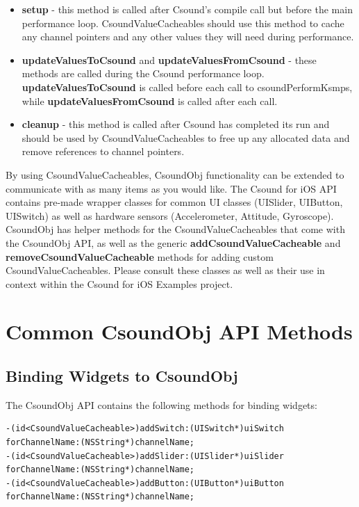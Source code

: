 \documentclass[11pt]{article}
\begin{document}
\begin{itemize}
\item \textbf{setup} - this method is called after Csound's compile call but before the main performance loop. CsoundValueCacheables should use this method to cache any channel pointers and any other values they will need during performance.
\item \textbf{updateValuesToCsound} and \textbf{updateValuesFromCsound} - these methods are called during the Csound performance loop. \textbf{updateValuesToCsound} is called before each call to csoundPerformKsmps, while \textbf{updateValuesFromCsound} is called after each call. 
\item \textbf{cleanup} - this method is called after Csound has completed its run and should be used by CsoundValueCacheables to free up any allocated data and remove references to channel pointers.
\end{itemize}

By using CsoundValueCacheables, CsoundObj functionality can be extended to communicate with as many items as you would like. The Csound for iOS API contains pre-made wrapper classes for common UI classes (UISlider, UIButton, UISwitch) as well as hardware sensors (Accelerometer, Attitude, Gyroscope).  CsoundObj has helper methods for the CsoundValueCacheables that come with the CsoundObj API, as well as the generic \textbf{addCsoundValueCacheable} and \textbf{removeCsoundValueCacheable} methods for adding custom CsoundValueCacheables. Please consult these classes as well as their use in context within the Csound for iOS Examples project.



\section{Common CsoundObj API Methods}

\subsection{Binding Widgets to CsoundObj}

The CsoundObj API contains the following methods for binding widgets:

\begin{lstlisting}[caption=Methods for Widget Binding]
-(id<CsoundValueCacheable>)addSwitch:(UISwitch*)uiSwitch forChannelName:(NSString*)channelName;
-(id<CsoundValueCacheable>)addSlider:(UISlider*)uiSlider forChannelName:(NSString*)channelName;
-(id<CsoundValueCacheable>)addButton:(UIButton*)uiButton forChannelName:(NSString*)channelName; 
\end{lstlisting}
\end{document}
